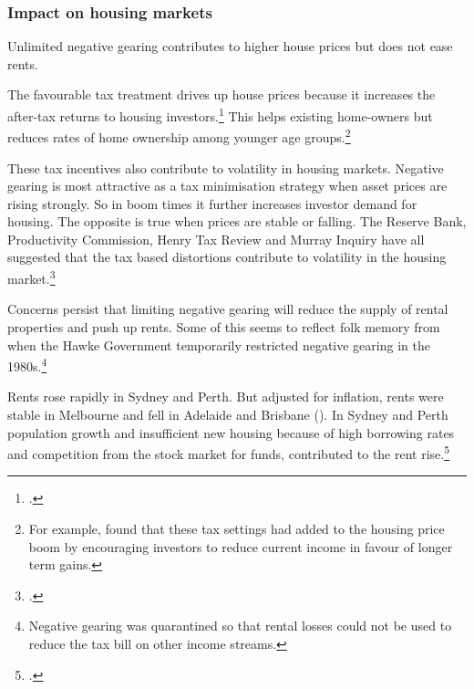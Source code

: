 \documentclass{grattan}\usepackage[]{graphicx}\usepackage[]{color}
\begin{document}
\subsubsection{Impact on housing markets}
Unlimited negative gearing contributes to higher house prices but does not ease rents. 

The favourable tax treatment drives up house prices because it increases the after-tax returns to housing investors.\footcite{RBA2015}   This helps existing home-owners but reduces rates of home ownership among younger age groups.\footnote{For example, \textcite{Commission2004} found that these tax settings had added to the housing price boom by encouraging investors to reduce current income in favour of longer term gains.}

These tax incentives also contribute to volatility in housing markets. Negative gearing is most attractive as a tax minimisation strategy when asset prices are rising strongly. So in boom times it further increases investor demand for housing. The opposite is true when prices are stable or falling. The Reserve Bank, Productivity Commission, Henry Tax Review and Murray Inquiry have all suggested that the tax based distortions contribute to volatility in the housing market.\footcites[p.45]{RBA2014}[p.75,131]{Commission2004}[p.70,418]{Treasury2010}[p.~278]{Inquiry2015}

Concerns persist that limiting negative gearing will reduce the supply of rental properties and push up rents. Some of this seems to reflect folk memory from when the Hawke Government temporarily restricted negative gearing in the 1980s.\footnote{Negative gearing was quarantined so that rental losses could not be used to reduce the tax bill on other income streams.}

Rents rose rapidly in Sydney and Perth. But adjusted for inflation, rents were stable in Melbourne and fell in Adelaide and Brisbane (). In Sydney and Perth population growth and insufficient new housing because of high borrowing rates and competition from the stock market for funds, contributed to the rent rise.\footcites[p.186]{badcock1991responsiveness}[pp.47-48]{Daley2013}
\end{document}

